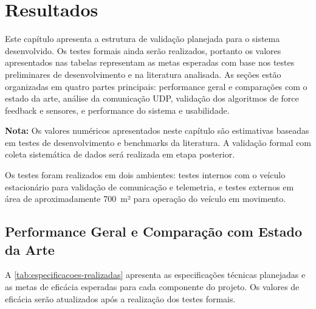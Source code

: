 \chapter{Resultados}
\label{chap:resultados}

Este capítulo apresenta a estrutura de validação planejada para o sistema desenvolvido. Os testes formais ainda serão realizados, portanto os valores apresentados nas tabelas representam as metas esperadas com base nos testes preliminares de desenvolvimento e na literatura analisada. As seções estão organizadas em quatro partes principais: performance geral e comparações com o estado da arte, análise da comunicação UDP, validação dos algoritmos de force feedback e sensores, e performance do sistema e usabilidade.

\textbf{Nota:} Os valores numéricos apresentados neste capítulo são estimativas baseadas em testes de desenvolvimento e benchmarks da literatura. A validação formal com coleta sistemática de dados será realizada em etapa posterior.

Os testes foram realizados em dois ambientes: testes internos com o veículo estacionário para validação de comunicação e telemetria, e testes externos em área de aproximadamente 700~m² para operação do veículo em movimento.

\section{Performance Geral e Comparação com Estado da Arte}
\label{sec:performance-geral}

A \autoref{tab:especificacoes-realizadas} apresenta as especificações técnicas planejadas e as metas de eficácia esperadas para cada componente do projeto. Os valores de eficácia serão atualizados após a realização dos testes formais.

\begin{table}[!ht]
\captionsetup{width=16cm}
\end{table}

